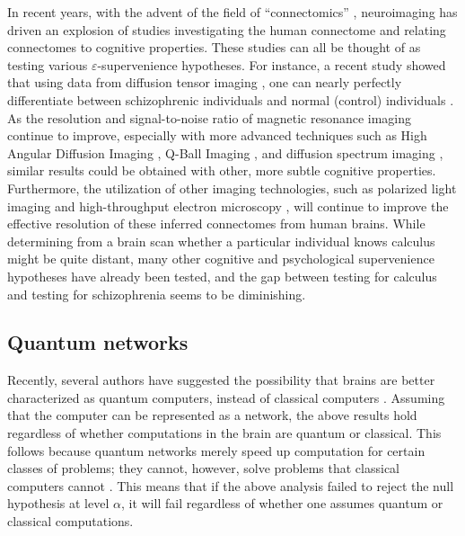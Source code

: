 \documentclass{article}
\newcommand{\eps}{\varepsilon}
\begin{document}
In recent years, with the advent of the field of ``connectomics'' \cite{SpornsKotter05,Hagmann05}, neuroimaging has driven an explosion of studies investigating the human connectome and relating connectomes to cognitive properties. %
These studies can all be thought of as testing various $\eps$-supervenience hypotheses.  For instance, a recent study showed that using data from diffusion tensor imaging \cite{Basser94}, one can nearly perfectly differentiate between schizophrenic individuals and normal (control) individuals \cite{ArdekaniSzeszko10}.  As the resolution and signal-to-noise ratio of magnetic resonance imaging continue to improve, especially with more advanced techniques such as High Angular Diffusion Imaging \cite{TuchWedeen02}, Q-Ball Imaging \cite{Tuch04}, and diffusion spectrum imaging \cite{WedeenWeisskoff05}, similar results could be obtained with other, more subtle cognitive properties.  Furthermore, the utilization of other imaging technologies, such as polarized light imaging \cite{PalmAmunts10} and high-throughput electron microscopy \cite{DenkHorstmann04,HayworthLichtman06}, will continue to improve the effective resolution of these inferred connectomes from human brains. While determining from a brain scan whether a particular individual knows calculus might be quite distant, many other cognitive and psychological supervenience hypotheses have already been tested, and the gap between testing for calculus and testing for schizophrenia seems to be diminishing.





\subsection{Quantum networks} %
\label{par:quantum_networks}

Recently, several authors have suggested the possibility that brains are better characterized as quantum computers, instead of classical computers \cite{Penrose99,Satinover02}.  Assuming that the computer can be represented as a network, the above results hold regardless of whether computations in the brain are quantum or classical.  This follows because quantum networks merely speed up computation for certain classes of problems; they cannot, however, solve problems that classical computers cannot \cite{NielsenChuang00}.  This means that if the above analysis failed to reject the null hypothesis at level $\alpha$, it will fail regardless of whether one assumes quantum or classical computations.
\end{document}
